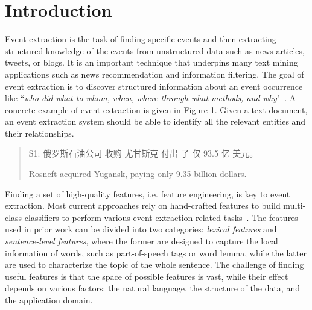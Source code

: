 \section{Introduction}

Event extraction is the task of finding specific events and then extracting structured knowledge of the events from
unstructured data such as news articles, tweets, or blogs. It is an important technique that underpins many text mining
applications such as news recommendation and information filtering.
The goal of event extraction is to discover structured information about an event occurrence like ``\emph{who did what to whom,
when, where through what methods, and why}"~\cite{Piskorski2013}. A concrete example of event extraction is
given in Figure 1. Given a text
document, an event extraction system should be able to identify all the relevant entities and their relationships.


\begin{quote}
S1: 俄罗斯石油公司 \hspace{0.3cm}收购 \hspace{0.3cm}尤甘斯克 \hspace{0.3cm}付出 \hspace{0.2cm}了 \hspace{0.2cm}仅 \hspace{0.3cm}93.5
\hspace{0.3cm}亿 \hspace{0.3cm}美元。

\hspace{0.52cm} Rosneft acquired Yugansk, paying only 9.35 billion dollars.
\end{quote}

Finding a set of high-quality features, i.e. feature engineering, is key to event extraction.
Most current approaches rely on hand-crafted features to build multi-class classifiers to perform various
event-extraction-related tasks~\cite{ahn2006stages,chen2009language,li2012employing,chen2012joint}. The
features used in prior work can be divided into two categories: \emph{lexical features} and \emph{sentence-level features}, where the
former are designed to capture the local information of words, such as part-of-speech tags or word lemma, while the latter are used to
characterize the topic of the whole sentence. The challenge of finding useful
features is that the space of possible features is vast, while their effect depends on various factors: the natural language, the structure of the data, and the application domain.

